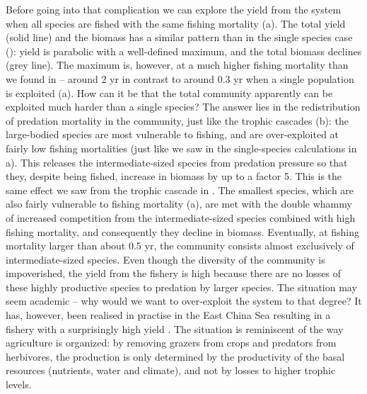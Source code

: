 Before going into that complication we can explore the yield from the system when all species are fished with the same fishing mortality (a).  The total yield (solid line) and the biomass has a similar pattern than in the single species case (): yield is parabolic with a well-defined maximum, and the total biomass declines (grey line).  The maximum is, however, at a much higher fishing mortality than we found in  -- around 2 yr{\per} in contrast to around 0.3 yr{\per} when a single population is exploited (a).  How can it be that the total community apparently can be exploited much harder than a single species?  The answer lies in the redistribution of predation mortality in the community, just like the trophic cascades (b): the large-bodied species are most vulnerable to fishing, and are over-exploited at fairly low fishing mortalities (just like we saw in the single-species calculations in a).  This releases the intermediate-sized species from predation pressure so that they, despite being fished, increase in biomass by up to a factor 5. This is the same effect we saw from the trophic cascade in .  The smallest species, which are also fairly vulnerable to fishing mortality (a), are met with the double whammy of increased competition from the intermediate-sized species combined with high fishing mortality, and consequently they decline in biomass.  Eventually, at fishing mortality larger than about 0.5 yr\per, the community consists almost exclusively of intermediate-sized species.  Even though the diversity of the community is impoverished, the yield from the fishery is high because there are no losses of these highly productive species to predation by larger species.  The situation may seem academic -- why would we want to over-exploit the system to that degree?  It has, however, been realised in practise in the East China Sea resulting in a fishery with a surprisingly high yield \citep{Szuwalski2017}. The situation is reminiscent of the way agriculture is organized: by removing grazers from crops and predators from herbivores, the production is only determined by the productivity of the basal resources (nutrients, water and climate), and not by losses to higher trophic levels.

